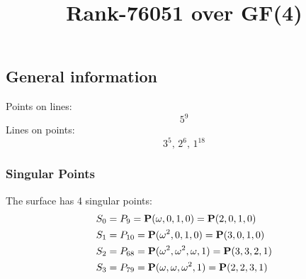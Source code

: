 \documentclass{article}
\newcommand\setTBstruts{\def\T{\rule{0pt}{2.6ex}}%
\def\B{\rule[-1.2ex]{0pt}{0pt}}}
\newcommand{\bP}{{\bf P}}
\begin{document}
 
\setTBstruts



{\allowdisplaybreaks%






\title{Rank-76051 over GF(4)}
\author{}%
\maketitle%
%
{}



\subsection*{General information}
Points on lines:
$$
5^9$$
Lines on points:
$$
3^5,\,2^6,\,1^{18}$$
\subsubsection*{Singular Points}
The surface has 4 singular points:\\
\begin{align*}
S_{0} &= P_{9}=\bP(\omega , 0, 1, 0) = \bP(2, 0, 1, 0)\\
S_{1} &= P_{10}=\bP(\omega^{2}, 0, 1, 0) = \bP(3, 0, 1, 0)\\
S_{2} &= P_{68}=\bP(\omega^{2}, \omega^{2}, \omega , 1) = \bP(3, 3, 2, 1)\\
S_{3} &= P_{79}=\bP(\omega , \omega , \omega^{2}, 1) = \bP(2, 2, 3, 1)\\
\end{align*}
}
\end{document}

